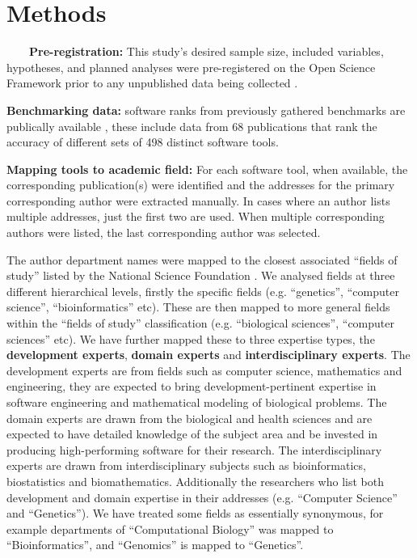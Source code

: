 \documentclass[fleqn,10pt,doc,onecolumn]{SelfArx}%
\begin{document}
\section*{Methods}

~~~~\textbf{Pre-registration:} This study's desired sample size, included variables, hypotheses, and
planned analyses were pre-registered on the Open Science Framework
prior to any unpublished data being collected \cite{gardner2024}.

\textbf{Benchmarking data:} software ranks from previously gathered
benchmarks are publically available \cite{Gardner:2022}, these include data from
68 publications that rank the accuracy of different sets of 498
distinct software tools.

\textbf{Mapping tools to academic field:} For each software tool, when
available, the corresponding publication(s) were identified and the
addresses for the primary corresponding author were extracted
manually. In cases where an author lists multiple addresses, just the
first two are used. When multiple corresponding authors were listed,
the last corresponding author was selected.

The author department names were mapped to the closest associated
``fields of study'' listed by the National Science Foundation
\cite{fields2014}. We analysed fields at three different hierarchical
levels, firstly the specific fields (e.g. ``genetics'', ``computer
science'', ``bioinformatics'' etc). These are then mapped to more
general fields within the ``fields of study'' classification
(e.g. ``biological sciences'', ``computer sciences'' etc). We have
further mapped these to three expertise types, the \textbf{development
  experts}, \textbf{domain experts} and \textbf{interdisciplinary
  experts}. The development experts are from fields such as computer
science, mathematics and engineering, they are expected to bring
development-pertinent expertise in software engineering and
mathematical modeling of biological problems. The domain experts are
drawn from the biological and health sciences and are expected to have
detailed knowledge of the subject area and be invested in producing
high-performing software for their research. The interdisciplinary
experts are drawn from interdisciplinary subjects such as
bioinformatics, biostatistics and biomathematics. Additionally the
researchers who list both development and domain expertise in their
addresses (e.g. ``Computer Science'' and ``Genetics''). We have treated some fields as essentially synonymous, for
example departments of ``Computational Biology'' was mapped to
``Bioinformatics'', and ``Genomics'' is mapped to ``Genetics''.
\end{document}
